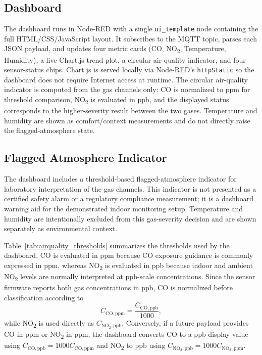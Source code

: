 \documentclass[conference]{IEEEtran}
\begin{document}
\subsection{Dashboard}
The dashboard runs in Node-RED with a single \texttt{ui\_template} node containing the full HTML/CSS/JavaScript layout. It subscribes to the MQTT topic, parses each JSON payload, and updates four metric cards (CO, NO\textsubscript{2}, Temperature, Humidity), a live Chart.js trend plot, a circular air quality indicator, and four sensor-status chips. Chart.js is served locally via Node-RED's \texttt{httpStatic} so the dashboard does not require Internet access at runtime. The circular air-quality indicator is computed from the gas channels only: CO is normalized to ppm for threshold comparison, NO\textsubscript{2} is evaluated in ppb, and the displayed status corresponds to the higher-severity result between the two gases. Temperature and humidity are shown as comfort/context measurements and do not directly raise the flagged-atmosphere state.


\subsection{Flagged Atmosphere Indicator}
The dashboard includes a threshold-based flagged-atmosphere indicator for laboratory interpretation of the gas channels. This indicator is not presented as a certified safety alarm or a regulatory compliance measurement; it is a dashboard warning aid for the demonstrated indoor monitoring setup. Temperature and humidity are intentionally excluded from this gas-severity decision and are shown separately as environmental context.

Table~\ref{tab:airquality_thresholds} summarizes the thresholds used by the dashboard. CO is evaluated in ppm because CO exposure guidance is commonly expressed in ppm, whereas NO\textsubscript{2} is evaluated in ppb because indoor and ambient NO\textsubscript{2} levels are normally interpreted at ppb-scale concentrations. Since the sensor firmware reports both gas concentrations in ppb, CO is normalized before classification according to
\begin{equation}
C_{\mathrm{CO,ppm}} = \frac{C_{\mathrm{CO,ppb}}}{1000},
\label{eq:co_ppb_to_ppm}
\end{equation}
while NO\textsubscript{2} is used directly as $C_{\mathrm{NO_2,ppb}}$. Conversely, if a future payload provides CO in ppm or NO\textsubscript{2} in ppm, the dashboard converts CO to a ppb display value using $C_{\mathrm{CO,ppb}}=1000C_{\mathrm{CO,ppm}}$ and NO\textsubscript{2} to ppb using $C_{\mathrm{NO_2,ppb}}=1000C_{\mathrm{NO_2,ppm}}$.
\end{document}
